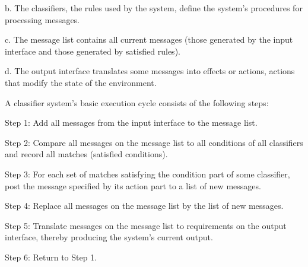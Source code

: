 \documentclass[12pt]{article}
\renewcommand{\_}{\kern-1.5pt\textunderscore\kern-1.5pt}
\begin{document}
\begin{adjustwidth}{1.0in}{0.0in}
b. The classifiers, the rules used by the system, define the system’s procedures for processing messages. \par

\end{adjustwidth}

\begin{adjustwidth}{1.0in}{0.0in}
c. The message list contains all current messages (those generated by the input interface and those generated by satisfied rules). \par

\end{adjustwidth}

\begin{adjustwidth}{1.0in}{0.0in}
d. The output interface translates some messages into effects or actions, actions that modify the state of the environment.\par

\end{adjustwidth}

A classifier system’s basic execution cycle consists of the following steps:\par

Step 1: Add all messages from the input interface to the message list.\par

Step 2: Compare all messages on the message list to all conditions of all classifiers and record all matches (satisfied conditions). \par

Step 3: For each set of matches satisfying the condition part of some classifier, post the message specified by its action part to a list of new messages.\par

Step 4: Replace all messages on the message list by the list of new messages. \par

Step 5: Translate messages on the message list to requirements on the output interface, thereby producing the system’s current output. \par

Step 6: Return to Step 1. \par
\end{document}
